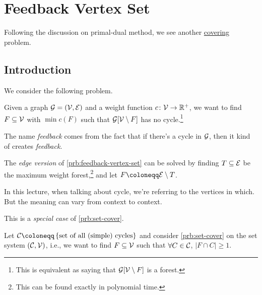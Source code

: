 \section{Feedback Vertex Set}

Following the discussion on primal-dual method, we see another \hyperref[def:covering]{covering} problem.

\subsection{Introduction}
We consider the following problem.

\begin{problem}\label{prb:feedback-vertex-set}
Given a graph \(\mathcal{\MakeUppercase{g}} = (\mathcal{\MakeUppercase{v}} , \mathcal{\MakeUppercase{e}} )\) and a weight function \(c\colon \mathcal{\MakeUppercase{v}} \to \mathbb{\MakeUppercase{r}} ^+\), we want to find \(F\subseteq \mathcal{\MakeUppercase{v}} \) with \(\min c(F)\) such that \(\mathcal{\MakeUppercase{g}} [\mathcal{\MakeUppercase{v}} \setminus F]\) has no cycle.\footnote{This is equivalent as saying that \(\mathcal{\MakeUppercase{g}} [\mathcal{\MakeUppercase{v}} \setminus F]\) is a forest.}
\end{problem}

\begin{note}[Feedback]
	The name \emph{feedback} comes from the fact that if there's a cycle in \(\mathcal{\MakeUppercase{g}} \), then it kind of creates \emph{feedback}.
\end{note}

\begin{note}
	The \emph{edge version} of \autoref{prb:feedback-vertex-set} can be solved by finding \(T\subseteq \mathcal{\MakeUppercase{e}} \) be the maximum weight forest,\footnote{This can be found exactly in polynomial time.} and let \(F \coloneqq \mathcal{\MakeUppercase{e}} \setminus T\).
\end{note}

\begin{notation}
	In this lecture, when talking about cycle, we're referring to the vertices in which. But the meaning can vary from context to context.
\end{notation}

\begin{remark}
	This is a \emph{special case} of \autoref{prb:set-cover}.
\end{remark}
\begin{explanation}
	Let \(\mathcal{\MakeUppercase{C}} \coloneqq \left\{ \text{set of all (simple) cycles}  \right\}\) and consider \autoref{prb:set-cover} on the set system \((\mathcal{\MakeUppercase{C}} , \mathcal{\MakeUppercase{v}} )\), i.e., we want to find \(F\subseteq \mathcal{\MakeUppercase{v}} \) such that \(\forall C\in \mathcal{\MakeUppercase{C}} \), \(\left\vert F \cap C \right\vert \geq 1\).
\end{explanation}

